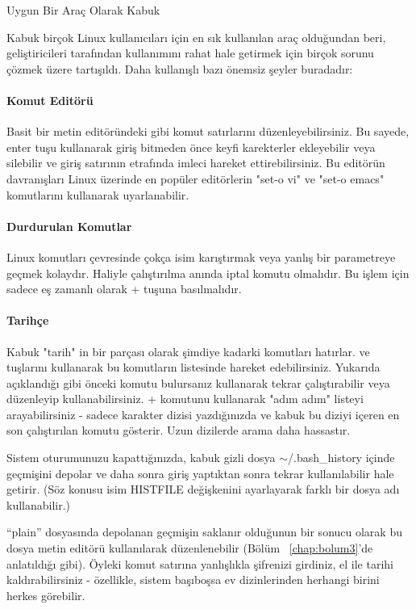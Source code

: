 \begin{section}{Uygun Bir Araç Olarak Kabuk}

Kabuk birçok Linux kullanıcıları için en sık kullanılan araç olduğundan beri, geliştiricileri tarafından kullanımını rahat hale getirmek için birçok sorunu çözmek üzere tartışıldı. Daha kullanışlı bazı önemsiz şeyler buradadır:

\paragraph{Komut Editörü} {Basit bir metin editöründeki gibi komut satırlarını düzenleyebilirsiniz. Bu sayede, enter tuşu kullanarak giriş bitmeden önce keyfi karekterler ekleyebilir veya silebilir ve giriş satırının etrafında imleci hareket ettirebilirsiniz. Bu editörün davranışları Linux üzerinde en popüler editörlerin "set-o vi" ve "set-o emacs" komutlarını kullanarak uyarlanabilir.}
\paragraph{Durdurulan Komutlar}{Linux komutları çevresinde çokça isim karıştırmak veya yanlış bir parametreye geçmek kolaydır. Haliyle çalıştırılma anında iptal komutu olmalıdır. Bu işlem için sadece eş zamanlı olarak \Ctrl+ tuşuna basılmalıdır.}
\paragraph{Tarihçe}{Kabuk "tarih" in bir parçası olarak şimdiye kadarki komutları hatırlar. \UArrow ve \DArrow tuşlarını kullanarak bu komutların listesinde hareket edebilirsiniz. Yukarıda açıklandığı gibi önceki komutu bulursanız \Return kullanarak tekrar çalıştırabilir veya düzenleyip kullanabilirsiniz. \Ctrl+ komutunu kullanarak "adım adım" listeyi arayabilirsiniz - sadece karakter dizisi yazdığınızda ve kabuk bu diziyi içeren en son çalıştırılan komutu gösterir. Uzun dizilerde arama daha hassastır.}

Sistem oturumunuzu kapattığınızda, kabuk gizli dosya $\sim$/.bash\_history içinde geçmişini depolar ve daha sonra giriş yaptıktan sonra tekrar kullanılabilir hale getirir. (Söz konusu isim HISTFILE değişkenini ayarlayarak farklı bir dosya adı kullanabilir.)

“plain” dosyasında depolanan geçmişin saklanır olduğunun bir sonucu olarak bu dosya metin editörü kullanılarak düzenlenebilir (Bölüm ~\ref{chap:bolum3}'de anlatıldığı gibi). Öyleki
komut satırına yanlışlıkla şifrenizi girdiniz, el ile tarihi kaldırabilirsiniz - özellikle, sistem başıboşsa ev dizinlerinden herhangi birini herkes görebilir.

\end{section}
